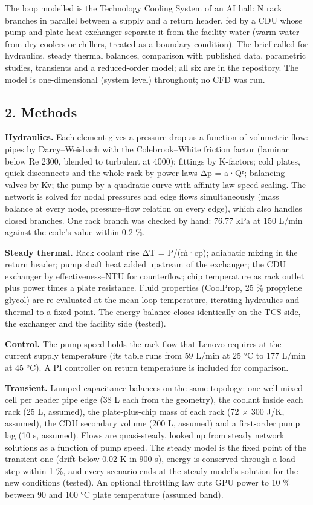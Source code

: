 \documentclass[
  10pt,
]{article}
\begin{document}
The loop modelled is the Technology Cooling System of an AI hall: N rack branches in parallel between a supply and a return header, fed by a CDU whose pump and plate heat exchanger separate it from the facility water (warm water from dry coolers or chillers, treated as a boundary condition). The brief called for hydraulics, steady thermal balances, comparison with published data, parametric studies, transients and a reduced-order model; all six are in the repository. The model is one-dimensional (system level) throughout; no CFD was run.

\hypertarget{methods}{%
\subsection{2. Methods}\label{methods}}

\textbf{Hydraulics.} Each element gives a pressure drop as a function of volumetric flow: pipes by Darcy--Weisbach with the Colebrook--White friction factor (laminar below Re 2300, blended to turbulent at 4000); fittings by K-factors; cold plates, quick disconnects and the whole rack by power laws Δp = a·Qⁿ; balancing valves by Kv; the pump by a quadratic curve with affinity-law speed scaling. The network is solved for nodal pressures and edge flows simultaneously (mass balance at every node, pressure--flow relation on every edge), which also handles closed branches. One rack branch was checked by hand: 76.77 kPa at 150 L/min against the code's value within 0.2 \%.

\textbf{Steady thermal.} Rack coolant rise ΔT = P/(ṁ·cp); adiabatic mixing in the return header; pump shaft heat added upstream of the exchanger; the CDU exchanger by effectiveness--NTU for counterflow; chip temperature as rack outlet plus power times a plate resistance. Fluid properties (CoolProp, 25 \% propylene glycol) are re-evaluated at the mean loop temperature, iterating hydraulics and thermal to a fixed point. The energy balance closes identically on the TCS side, the exchanger and the facility side (tested).

\textbf{Control.} The pump speed holds the rack flow that Lenovo requires at the current supply temperature (its table runs from 59 L/min at 25 °C to 177 L/min at 45 °C). A PI controller on return temperature is included for comparison.

\textbf{Transient.} Lumped-capacitance balances on the same topology: one well-mixed cell per header pipe edge (38 L each from the geometry), the coolant inside each rack (25 L, assumed), the plate-plus-chip mass of each rack (72 × 300 J/K, assumed), the CDU secondary volume (200 L, assumed) and a first-order pump lag (10 s, assumed). Flows are quasi-steady, looked up from steady network solutions as a function of pump speed. The steady model is the fixed point of the transient one (drift below 0.02 K in 900 s), energy is conserved through a load step within 1 \%, and every scenario ends at the steady model's solution for the new conditions (tested). An optional throttling law cuts GPU power to 10 \% between 90 and 100 °C plate temperature (assumed band).
\end{document}
